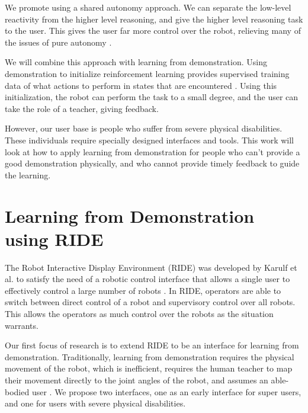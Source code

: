 \documentclass[letterpaper]{article}
\begin{document}

We promote using a shared autonomy approach. We can separate the low-level reactivity from the higher level reasoning, and give the higher level reasoning task to the user. This gives the user far more control over the robot, relieving many of the issues of pure autonomy \cite{Goodrich:2007:HIS:1348099.1348100}.

We will combine this approach with learning from demonstration. Using demonstration to initialize reinforcement learning provides supervised training data of what actions to perform in states that are encountered \cite{Bagnell_2013_7451}. Using this initialization, the robot can perform the task to a small degree, and the user can take the role of a teacher, giving feedback.

However, our user base is people who suffer from severe physical disabilities. These individuals require specially designed interfaces and tools. This work will look at how to apply learning from demonstration for people who can't provide a good demonstration physically, and who cannot provide timely feedback to guide the learning.

\section{Learning from Demonstration \\ using RIDE}
\label{Learning by Demonstration}
The Robot Interactive Display Environment (RIDE) was developed by Karulf et al. to satisfy the need of a robotic control interface that allows a single user to effectively control a large number of robots \cite{hri11c}. In RIDE, operators are able to switch between direct control of a robot and supervisory control over all robots. This allows the operators as much control over the robots as the situation warrants.

Our first focus of research is to extend RIDE to be an interface for learning from demonstration.  Traditionally, learning from demonstration requires the physical movement of the robot, which is inefficient, requires the human teacher to map their movement directly to the joint angles of the robot, and assumes an able-bodied user \cite{Bagnell_2013_7451}. We propose two interfaces, one as an early interface for super users, and one for users with severe physical disabilities. 
\end{document}
